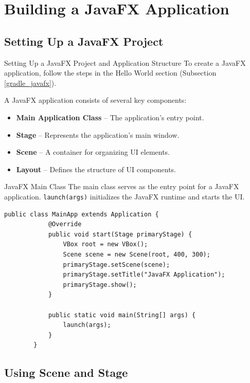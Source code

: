 \documentclass[aspectratio=169, table]{beamer}
\begin{document}
\section{Building a JavaFX Application}

\subsection{Setting Up a JavaFX Project}

\begin{frame}[fragile]{\LARGE{Setting Up a JavaFX Project and Application Structure}}
	\vspace{20pt}
	To create a JavaFX application, follow the steps in the Hello World section  
	(Subsection \ref{gradle_javafx}).
	
	A JavaFX application consists of several key components:
	\begin{itemize}
		\item \textbf{Main Application Class} – The application's entry point.
		\item \textbf{Stage} – Represents the application's main window.
		\item \textbf{Scene} – A container for organizing UI elements.
		\item \textbf{Layout} – Defines the structure of UI components.
	\end{itemize}
\end{frame}


\begin{frame}[fragile]{JavaFX Main Class}
	\vspace{20pt}
	The main class serves as the entry point for a JavaFX application.  
	\texttt{launch(args)} initializes the JavaFX runtime and starts the UI.
	
	\begin{lstlisting}[style=JavaStyle]
		public class MainApp extends Application {
			@Override
			public void start(Stage primaryStage) {
				VBox root = new VBox();
				Scene scene = new Scene(root, 400, 300);
				primaryStage.setScene(scene);
				primaryStage.setTitle("JavaFX Application");
				primaryStage.show();
			}
			
			public static void main(String[] args) {
				launch(args);
			}
		}
	\end{lstlisting}
\end{frame}


\subsection{Using Scene and Stage}
\end{document}
